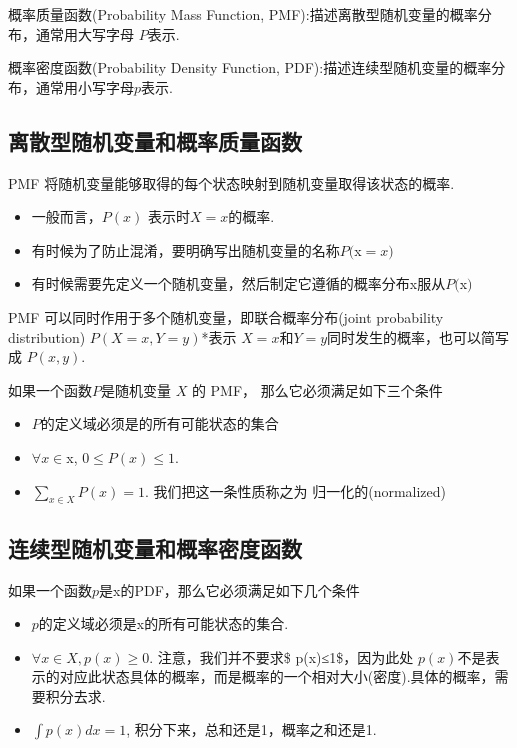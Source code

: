 概率质量函数(Probability Mass Function,
PMF):描述离散型随机变量的概率分布，通常用大写字母 \(P\)表示.

概率密度函数(Probability Density Function,
PDF):描述连续型随机变量的概率分布，通常用小写字母\(p\)表示.

\subsection{离散型随机变量和概率质量函数}\label{ux79bbux6563ux578bux968fux673aux53d8ux91cfux548cux6982ux7387ux8d28ux91cfux51fdux6570}

PMF 将随机变量能够取得的每个状态映射到随机变量取得该状态的概率.

\begin{itemize}
 
\item
  一般而言，\(P(x)​\) 表示时\(X=x​\)的概率.
\item
  有时候为了防止混淆，要明确写出随机变量的名称\(P(​\)x\(=x)​\)
\item
  有时候需要先定义一个随机变量，然后制定它遵循的概率分布x服从\(P(​\)x​\()​\)
\end{itemize}

PMF 可以同时作用于多个随机变量，即联合概率分布(joint probability
distribution) \(P(X=x,Y=y)\)*表示
\(X=x\)和\(Y=y\)同时发生的概率，也可以简写成 \(P(x,y)\).

如果一个函数\(P​\)是随机变量 \(X​\) 的 PMF， 那么它必须满足如下三个条件

\begin{itemize}
 
\item
  \(P​\)的定义域必须是的所有可能状态的集合
\item
  \(∀x∈​\)x, \(0 \leq P(x) \leq 1 ​\).
\item
  \(∑_{x∈X} P(x)=1\). 我们把这一条性质称之为 归一化的(normalized)
\end{itemize}

\subsection{连续型随机变量和概率密度函数}\label{ux8fdeux7eedux578bux968fux673aux53d8ux91cfux548cux6982ux7387ux5bc6ux5ea6ux51fdux6570}

如果一个函数\(p​\)是x的PDF，那么它必须满足如下几个条件

\begin{itemize}
 
\item
  \(p\)的定义域必须是x的所有可能状态的集合.
\item
  \(∀x∈X,p(x)≥0\). 注意，我们并不要求\$ p(x)≤1\$，因为此处
  \(p(x)\)不是表示的对应此状态具体的概率，而是概率的一个相对大小(密度).具体的概率，需要积分去求.
\item
  \(∫p(x)dx=1\), 积分下来，总和还是1，概率之和还是1.
\end{itemize}

